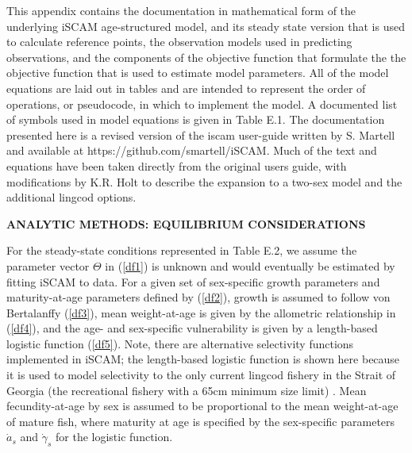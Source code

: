\documentclass[11pt]{article}   %
\def\AppLet{E}                   %
\def\headc{\vspace{-1ex}} %
\def\subsub#1{\noindent {\bf #1} \headc}    %
\newcommand{\eref}[1]{(\ref{#1})}
\begin{document}
This appendix contains the documentation in mathematical form of the underlying iSCAM age-structured model, and its steady state version that is used to calculate reference points, the observation models used in predicting observations, and the components of the objective function that formulate the the objective function that is used to estimate model parameters.  All of the model equations are laid out in tables and are intended to represent the order of operations, or pseudocode, in which to implement the model.  A documented list of symbols used in model equations is given in Table \AppLet.1.  The documentation presented here is a revised version of the iscam user-guide written by S. Martell and available at https://github.com/smartell/iSCAM.  Much of the text and equations have been taken directly from the original users guide, with modifications by K.R. Holt to describe the expansion to a two-sex model and the additional lingcod options.



{ \bf ANALYTIC METHODS: EQUILIBRIUM CONSIDERATIONS}

\subsub{A Steady-State Age-Structured Model}

For the steady-state conditions represented in Table \AppLet.2, we assume the parameter vector $\Theta$ in \eref{df1} is unknown and would eventually be estimated by fitting iSCAM to data.  For a given set of sex-specific growth parameters and maturity-at-age parameters defined by \eref{df2}, growth is assumed to follow von Bertalanffy \eref{df3}, mean weight-at-age is given by the allometric relationship in \eref{df4}, and the age- and sex-specific vulnerability is given by a length-based logistic function \eref{df5}.  Note, there are alternative selectivity functions implemented in iSCAM; the length-based logistic function is shown here because it is used to model selectivity to the only current lingcod fishery in the Strait of Georgia (the recreational fishery with a 65cm minimum size limit) .  Mean fecundity-at-age by sex is assumed to be proportional to the mean weight-at-age of mature fish, where maturity at age is specified by the sex-specific parameters $\dot{a}_s$ and $\dot{\gamma}_s$ for the logistic function.

\clearpage



\end{document}
